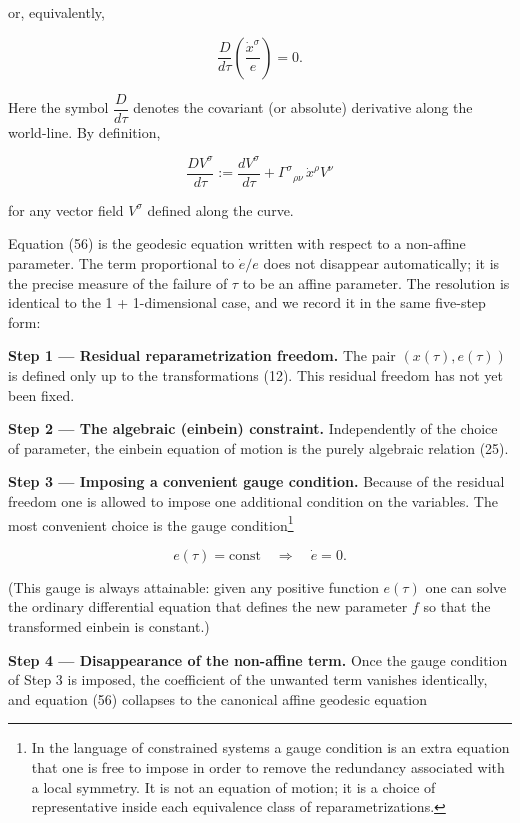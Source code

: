 \documentclass[
]{article}
\begin{document}
or, equivalently,

\[\frac{D}{d\tau} \left( \frac{\dot{x}^{\sigma}}{e} \right) = 0. \tag{57}\]

Here the symbol \(\dfrac{D}{d\tau}\) denotes the covariant (or absolute)
derivative along the world-line. By definition,

\[\frac{D V^{\sigma}}{d\tau} := \frac{d V^{\sigma}}{d\tau} + \Gamma^{\sigma}{}_{\rho\nu}\, \dot{x}^{\rho} V^{\nu} \tag{58}\]

for any vector field \(V^{\sigma}\) defined along the curve.

Equation (56) is the geodesic equation written with respect to a
non-affine parameter. The term proportional to \(\dot{e}/e\) does not
disappear automatically; it is the precise measure of the failure of
\(\tau\) to be an affine parameter. The resolution is identical to the 1
+ 1-dimensional case, and we record it in the same five-step form:

\textbf{Step 1 --- Residual reparametrization freedom.} The pair
\((x(\tau), e(\tau))\) is defined only up to the transformations (12).
This residual freedom has not yet been fixed.

\textbf{Step 2 --- The algebraic (einbein) constraint.} Independently of
the choice of parameter, the einbein equation of motion is the purely
algebraic relation (25).

\textbf{Step 3 --- Imposing a convenient gauge condition.} Because of
the residual freedom one is allowed to impose one additional condition
on the variables. The most convenient choice is the gauge
condition\footnote{In the language of constrained systems a gauge
  condition is an extra equation that one is free to impose in order to
  remove the redundancy associated with a local symmetry. It is not an
  equation of motion; it is a choice of representative inside each
  equivalence class of reparametrizations.}

\[e(\tau) = \mathrm{const} \quad \Longrightarrow \quad \dot{e} = 0. \tag{59}\]

(This gauge is always attainable: given any positive function
\(e(\tau)\) one can solve the ordinary differential equation that
defines the new parameter \(f\) so that the transformed einbein is
constant.)

\textbf{Step 4 --- Disappearance of the non-affine term.} Once the gauge
condition of Step 3 is imposed, the coefficient of the unwanted term
vanishes identically, and equation (56) collapses to the canonical
affine geodesic equation
\end{document}

